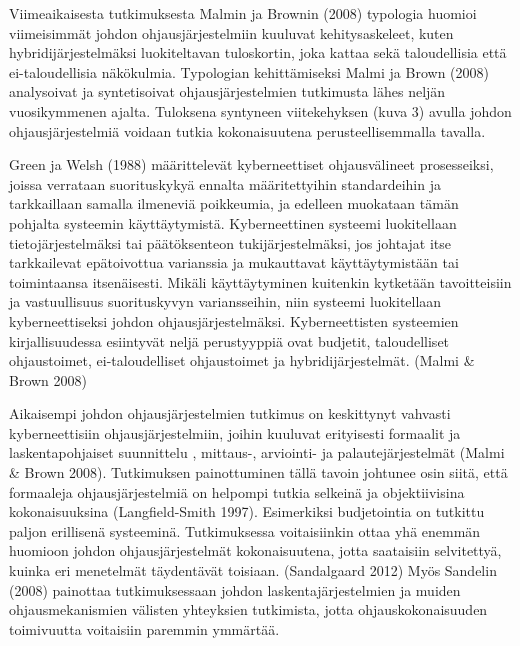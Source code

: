 \documentclass[12pt,a4paper,oneside,pdftex]{report}
\begin{document}
Viimeaikaisesta tutkimuksesta Malmin ja Brownin (2008) typologia huomioi viimeisimmät johdon ohjausjärjestelmiin kuuluvat kehitysaskeleet, kuten hybridijärjestelmäksi luokiteltavan tuloskortin, joka kattaa sekä taloudellisia että ei-taloudellisia näkökulmia. Typologian kehittämiseksi Malmi ja Brown (2008) analysoivat ja syntetisoivat ohjausjärjestelmien tutkimusta lähes neljän vuosikymmenen ajalta. Tuloksena syntyneen viitekehyksen (kuva 3) avulla johdon ohjausjärjestelmiä voidaan tutkia kokonaisuutena perusteellisemmalla tavalla.

Green ja Welsh (1988) määrittelevät kyberneettiset ohjausvälineet prosesseiksi, joissa verrataan suorituskykyä ennalta määritettyihin standardeihin ja tarkkaillaan samalla ilmeneviä poikkeumia, ja edelleen muokataan tämän pohjalta systeemin käyttäytymistä. Kyberneettinen systeemi luokitellaan tietojärjestelmäksi tai päätöksenteon tukijärjestelmäksi, jos johtajat itse tarkkailevat epätoivottua varianssia ja mukauttavat käyttäytymistään tai toimintaansa itsenäisesti. Mikäli käyttäytyminen kuitenkin kytketään tavoitteisiin ja vastuullisuus suorituskyvyn variansseihin, niin systeemi luokitellaan kyberneettiseksi johdon ohjausjärjestelmäksi. Kyberneettisten systeemien kirjallisuudessa esiintyvät neljä perustyyppiä ovat budjetit, taloudelliset ohjaustoimet, ei-taloudelliset ohjaustoimet ja hybridijärjestelmät. (Malmi & Brown 2008)

Aikaisempi johdon ohjausjärjestelmien tutkimus on keskittynyt vahvasti kyberneettisiin ohjausjärjestelmiin, joihin kuuluvat erityisesti formaalit ja laskentapohjaiset suunnittelu ,  mittaus-, arviointi- ja palautejärjestelmät (Malmi & Brown 2008). Tutkimuksen painottuminen tällä tavoin johtunee osin siitä, että formaaleja ohjausjärjestelmiä on helpompi tutkia selkeinä ja objektiivisina kokonaisuuksina (Langfield-Smith 1997). Esimerkiksi budjetointia on tutkittu paljon erillisenä systeeminä. Tutkimuksessa voitaisiinkin ottaa yhä enemmän huomioon johdon ohjausjärjestelmät kokonaisuutena, jotta saataisiin selvitettyä, kuinka eri menetelmät täydentävät toisiaan. (Sandalgaard 2012) Myös Sandelin (2008) painottaa tutkimuksessaan johdon laskentajärjestelmien ja muiden ohjausmekanismien välisten yhteyksien tutkimista, jotta ohjauskokonaisuuden toimivuutta voitaisiin paremmin ymmärtää. 
\end{document}
